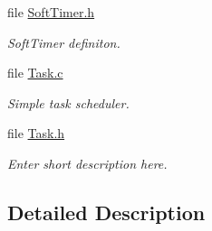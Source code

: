 \begin{DoxyCompactItemize}
file \hyperlink{_soft_timer_8h}{Soft\+Timer.\+h}
\begin{DoxyCompactList}\small\item\em Soft\+Timer definiton. \end{DoxyCompactList}\item 
file \hyperlink{_task_8c}{Task.\+c}
\begin{DoxyCompactList}\small\item\em Simple task scheduler. \end{DoxyCompactList}\item 
file \hyperlink{_task_8h}{Task.\+h}
\begin{DoxyCompactList}\small\item\em Enter short description here. \end{DoxyCompactList}\end{DoxyCompactItemize}


\subsection{Detailed Description}

